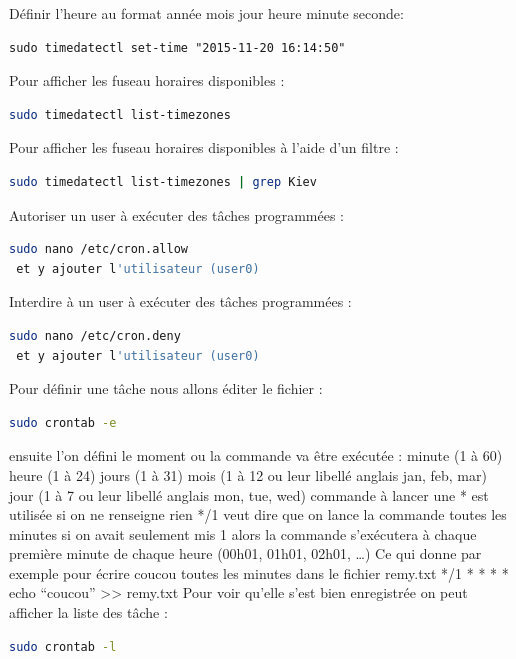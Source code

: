 \documentclass[a4paper]{article}
\begin{document}
\begin{adjustwidth}{-2cm}{-2cm}
\noindent Définir l’heure au format année mois jour heure minute seconde:
\begin{lstlisting}
sudo timedatectl set-time "2015-11-20 16:14:50"
\end{lstlisting}
\newpage
\noindent Pour afficher les fuseau horaires disponibles :
\begin{lstlisting}[language=bash]
 sudo timedatectl list-timezones
\end{lstlisting}

\noindent Pour afficher les fuseau horaires disponibles à l'aide d’un filtre :
\begin{lstlisting}[language=bash]
 sudo timedatectl list-timezones | grep Kiev
\end{lstlisting}

\noindent Autoriser un user à exécuter des tâches programmées :
\begin{lstlisting}[language=bash]
 sudo nano /etc/cron.allow
 et y ajouter l'utilisateur (user0)
\end{lstlisting}

\noindent Interdire à un user à exécuter des tâches programmées :
\begin{lstlisting}[language=bash]
 sudo nano /etc/cron.deny
 et y ajouter l'utilisateur (user0)
\end{lstlisting}

\noindent Pour définir une tâche nous allons éditer le fichier :
\begin{lstlisting}[language=bash]
 sudo crontab -e
\end{lstlisting}
ensuite l’on défini le moment ou la commande va être exécutée :
minute (1 à 60)
heure (1 à 24)
jours (1 à 31)
mois (1 à 12 ou leur libellé anglais jan, feb, mar)
jour (1 à 7 ou leur libellé anglais mon, tue, wed)
commande à lancer
une * est utilisée si on ne renseigne rien
*/1 veut dire que on lance la commande toutes les minutes si on avait seulement mis 1 alors la commande s'exécutera à chaque première minute de chaque heure (00h01, 01h01, 02h01, …)
\newline \newline
Ce qui donne par exemple pour écrire coucou toutes les minutes dans le fichier remy.txt
*/1 * * * * echo “coucou” >> remy.txt
\newline \newline
\noindent Pour voir qu’elle s’est bien enregistrée on peut afficher la liste des tâche :
\begin{lstlisting}[language=bash]
 sudo crontab -l
\end{lstlisting}


\end{adjustwidth}
\end{document}
